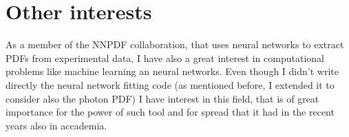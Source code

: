 \documentclass[11pt,a4paper]{moderncv}        %
\begin{document}
\section{Other interests}

As a member of the NNPDF collaboration, that uses neural networks to extract PDFs from experimental data, I have also a great interest
in computational problems like machine learning an neural networks.
Even though I didn't write directly the neural network fitting code (as mentioned before, I extended it to consider also the photon PDF)
I have interest in this field, that is of great importance for the power of such tool and for spread that it had in the recent years
also in accademia.



\end{document}
